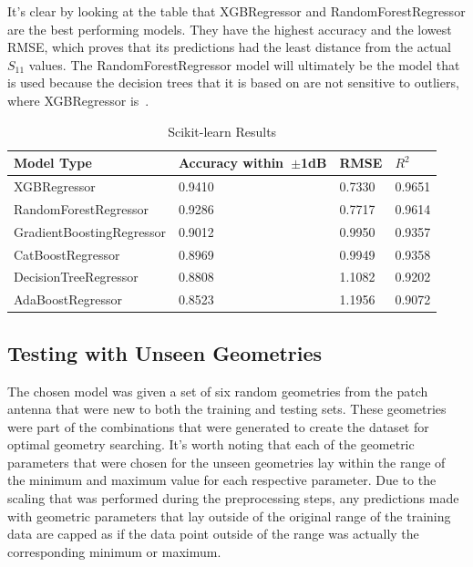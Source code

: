 \documentclass[conference]{IEEEtran}
\begin{document}
It's clear by looking at the table that XGBRegressor and RandomForestRegressor are the best performing models. They have the highest accuracy and the lowest RMSE, which proves that its predictions had the least distance from the actual $S_{11}$ values. The RandomForestRegressor model will ultimately be the model that is used because the decision trees that it is based on are not sensitive to outliers, where XGBRegressor is~\cite{BROWN2009541,Li_2018}. 

\begin{table}[h]
\caption{Scikit-learn Results}
\begin{center}
\begin{tabular}{ |l|l|l|l| }
    \hline
    Model Type & Accuracy within~$\pm$1dB & RMSE & $R^2$ \\ 
    \hline
    XGBRegressor & 0.9410 & 0.7330 & 0.9651 \\  
    \hline
    RandomForestRegressor & 0.9286 & 0.7717 & 0.9614 \\
    \hline  
    GradientBoostingRegressor & 0.9012 & 0.9950 & 0.9357 \\
    \hline
    CatBoostRegressor & 0.8969 & 0.9949 & 0.9358 \\    
    \hline
    DecisionTreeRegressor & 0.8808 & 1.1082 & 0.9202 \\  
    \hline
    AdaBoostRegressor & 0.8523 & 1.1956 & 0.9072 \\  
    \hline
\end{tabular}
\end{center}
\label{comparing_sklearn}
\end{table}

\subsection{Testing with Unseen Geometries}
The chosen model was given a set of six random geometries from the patch antenna that were new to both the training and testing sets. These geometries were part of the combinations that were generated to create the dataset for optimal geometry searching. It's worth noting that each of the geometric parameters that were chosen for the unseen geometries lay within the range of the minimum and maximum value for each respective parameter. Due to the scaling that was performed during the preprocessing steps, any predictions made with geometric parameters that lay outside of the original range of the training data are capped as if the data point outside of the range was actually the corresponding minimum or maximum. 
\end{document}

